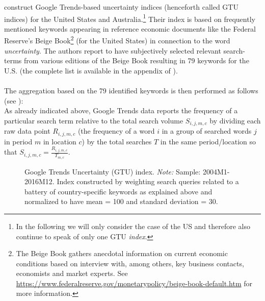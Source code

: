 \documentclass[a4paper,12pt,oneside,pointednumbers,bibtotoc,bigheadings,liststotoc]{scrbook}
\begin{document}
\citet{castelnuovoandtran:17} construct Google Trends-based uncertainty indices (henceforth called GTU indices) for the United States and Australia.\footnote{In the following we will only consider the case of the US and therefore also continue to speak of only one GTU \textit{index}.} Their index is based on frequently mentioned keywords appearing in reference economic documents like the Federal Reserve's Beige Book\footnote{The Beige Book gathers anecdotal information on current economic conditions based on interview with, among others, key business contacts, economists and market experts. See \url{https://www.federalreserve.gov/monetarypolicy/beige-book-default.htm} for more information.} (for the United States) in connection to the word \textit{uncertainty}. The authors report to have subjectively selected relevant search-terms from various editions of the Beige Book resulting in 79 keywords for the U.S. (the complete list is available in the appendix of \citealp{castelnuovoandtran:17}). \\
\\
The aggregation based on the 79 identified keywords is then performed as follows (see \citet{castelnuovoandtran:17}): \\
As already indicated above, Google Trends data reports the frequency of a particular search term relative to the total search volume $S_{i, j, m, c}$ by dividing each raw data point $R_{i, j, m, c}$ (the frequency of a word $i$ in a group of searched words $j$ in period $m$ in location $c$) by the total searches $T$ in the same period/location so that $S_{i, j, m, c} = \frac{R_{i, j, m, c}}{T_{m, c}}$. 


\begin{figure}[h]
   \centering
   \setlength\fboxsep{0pt}
   \setlength\fboxrule{0pt}
      \caption[Google Trends Uncertainty (GTU) index.]{Google Trends Uncertainty (GTU) index.
      \textit{Note:} Sample: 2004M1-2016M12. Index constructed by weighting search queries related to a battery of country-specific keywords as explained above and normalized to have mean = 100 and standard deviation = 30.}   \label{fig:gtuindex}
\end{figure}
\end{document}
